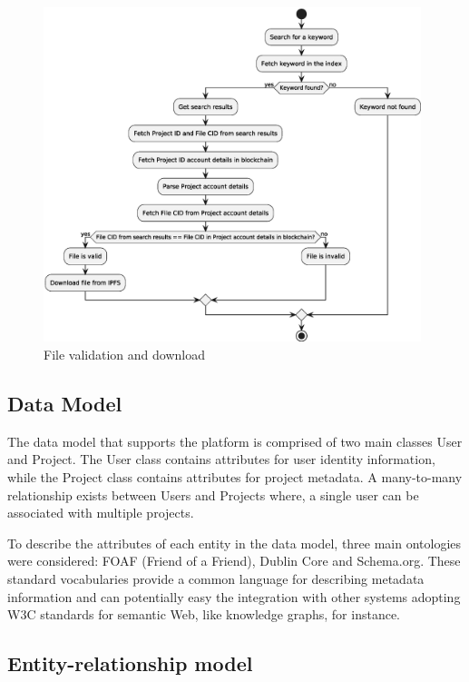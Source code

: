 \documentclass{article}
\begin{document}
\begin{figure}[htbp]
      \centering
      \includegraphics[width=0.98\textwidth, keepaspectratio]{keyword_and_file_validation.eps}
      \caption{File validation and download}
      \label{fig:c4_file_validation}
\end{figure}




\subsection{Data Model}

The data model that supports the platform is comprised of two main classes User and Project. The User class contains attributes for user identity information, while the Project class contains attributes for project metadata. A many-to-many relationship exists between Users and Projects where, a single user can be associated with multiple projects.

To describe the attributes of each entity in the data model, three main ontologies were considered: FOAF (Friend of a Friend), Dublin Core and Schema.org. These standard vocabularies provide a common language for describing metadata information and can potentially easy the integration with other systems adopting W3C standards for semantic Web, like knowledge graphs, for instance.

\subsection{Entity-relationship model}
\end{document}
